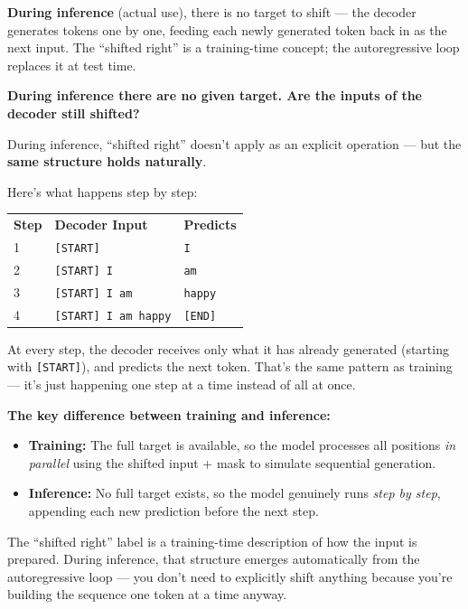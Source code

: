 \bigskip

\textbf{During inference} (actual use), there is no target to shift --- the decoder generates tokens one by one, feeding each newly generated token back in as the next input. The ``shifted right'' is a training-time concept; the autoregressive loop replaces it at test time.

\bigskip
\bigskip

\textbf{During inference there are no given target. Are the inputs of the decoder still shifted?}

\medskip

During inference, ``shifted right'' doesn't apply as an explicit operation --- but the \textbf{same structure holds naturally}.

Here's what happens step by step:

\begin{center}
\begin{tabular}{lll}
\textbf{Step} & \textbf{Decoder Input} & \textbf{Predicts} \\[4pt]
1 & \texttt{[START]} & \texttt{I} \\
2 & \texttt{[START] I} & \texttt{am} \\
3 & \texttt{[START] I am} & \texttt{happy} \\
4 & \texttt{[START] I am happy} & \texttt{[END]} \\
\end{tabular}
\end{center}

At every step, the decoder receives only what it has already generated (starting with \texttt{[START]}), and predicts the next token. That's the same pattern as training --- it's just happening one step at a time instead of all at once.

\bigskip

\textbf{The key difference between training and inference:}

\begin{itemize}
    \item \textbf{Training:} The full target is available, so the model processes all positions \textit{in parallel} using the shifted input + mask to simulate sequential generation.
    \item \textbf{Inference:} No full target exists, so the model genuinely runs \textit{step by step}, appending each new prediction before the next step.
\end{itemize}

The ``shifted right'' label is a training-time description of how the input is prepared. During inference, that structure emerges automatically from the autoregressive loop --- you don't need to explicitly shift anything because you're building the sequence one token at a time anyway.

